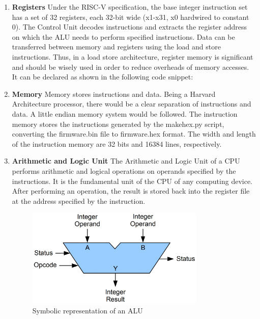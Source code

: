 \begin{enumerate}
\item \textbf{Registers} \newline
Under the RISC-V specification, the base integer instruction set has a set of 32 registers, each 32-bit wide (x1-x31, x0 hardwired to constant 0). The Control Unit decodes instructions and extracts the register address on which the ALU needs to perform specified instructions. Data can be transferred between memory and registers using the load and store instructions. Thus, in a load store architecture, register memory is significant and should be wisely used in order to reduce overheads of memory accesses. It can be declared as shown in the following code snippet:

\item \textbf{Memory} \newline
Memory stores instructions and data. Being a Harvard Architecture processor, there would be a clear separation of instructions and data. A little endian memory system would be followed. The instruction memory stores the instructions generated by the makehex.py script, converting the firmware.bin file to firmware.hex format. The width and length of the instruction memory are 32 bits and 16384 lines, respectively. 

\item \textbf{Arithmetic and Logic Unit} \newline
The Arithmetic and Logic Unit of a CPU performs arithmetic and logical operations on operands specified by the instructions. It is the fundamental unit of the CPU of any computing device. After performing an operation, the result is stored back into the register file at the address specified by the instruction.

\begin{figure}
\centering
\includegraphics[width=8.5cm]{figures/ALU_block.PNG}
\caption{Symbolic representation of an ALU}
\label{fig:riscv6}
\end{figure}

\end{enumerate}






